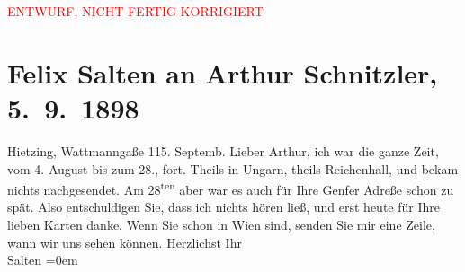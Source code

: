 
\begin{center}
            \textcolor{red}{ENTWURF, NICHT FERTIG KORRIGIERT}
                      \end{center}
            
         \renewcommand{\erwaehnteOrte}{Orte: Bad Reichenhall, Genf, Ungarn, Wattmanngasse, Wien}
         \renewcommand{\erwaehnteWerke}{}
               \section[Felix Salten an Arthur Schnitzler, 5. 9. 1898]{ Felix Salten an Arthur Schnitzler, 5. 9. 1898}\nopagebreak{}\rehead{ }\begin{ledgroupsized}[t]{13cm}\normalsize\beginnumbering \toendnotes[C]{\smallbreak\pagebreak[2]} 
\pstart
           \raggedleft{}{\pb}Hietzing, Wattmanngaße 115. Septemb.\pend
           \pstart
           Lieber Arthur, ich war die ganze Zeit, vom 4. August
               bis zum 28., fort. Theils in Ungarn, theils
               Reichenhall, und bekam nichts nachgesendet. Am
                     28\textsuperscript{ten} aber war es auch für Ihre Genfer Adreße schon zu spät. Also entschuldigen Sie, dass
               ich nichts hören ließ, und erst heute für Ihre lieben Karten danke. Wenn Sie schon in
                  Wien sind, senden Sie mir eine Zeile, wann wir
               uns sehen können.\pend
           \pstart
           Herzlichst Ihr {\\[\baselineskip]}\spacefill\mbox{Salten}\pend
           \leftskip=0em{}
         
         \endnumbering{}\end{ledgroupsized}\begin{anhang}\end{anhang}\newcommand{\dateiname}{L03281}\newcommand{\titel}{Felix Salten an Arthur Schnitzler, 5. 9. 1898}\newcommand{\editorInnen}{Martin Anton Müller und Laura Untner}
      
